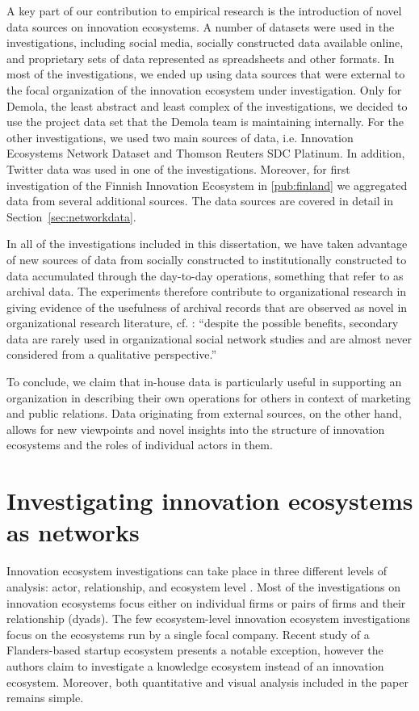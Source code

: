 A key part of our contribution to empirical research is the introduction of novel data sources on innovation ecosystems. A number of datasets were used in the investigations, including social media, socially constructed data available online, and proprietary sets of data represented as spreadsheets and other formats. In most of the investigations, we ended up using data sources that were external to the focal organization of the innovation ecosystem under investigation. Only for Demola, the least abstract and least complex of the investigations, we decided to use the project data set that the Demola team is maintaining internally. For the other investigations, we used two main sources of data, i.e. Innovation Ecosystems Network Dataset and Thomson Reuters SDC Platinum. In addition, Twitter data was used in one of the investigations. Moreover, for first investigation of the Finnish Innovation Ecosystem in \ref{pub:finland} we aggregated data from several additional sources. The data sources are covered in detail in Section~\ref{sec:networkdata}.

In all of the investigations included in this dissertation, we have taken advantage of new sources of data from socially constructed to institutionally constructed to data accumulated through the day-to-day operations, something that \cite{Williams2015MixedAnalysis} refer to as archival data. The experiments therefore contribute to organizational research in giving evidence of the usefulness of archival records that are observed as novel in organizational research literature, cf. \cite{Williams2015MixedAnalysis}: ``despite the possible benefits, secondary data are rarely used in organizational social network studies and are almost never considered from a qualitative perspective.'' 

To conclude, we claim that in-house data is particularly useful in supporting an organization in describing their own operations for others in context of marketing and public relations. Data originating from external sources, on the other hand, allows for new viewpoints and novel insights into the structure of innovation ecosystems and the roles of individual actors in them.

\section{Investigating innovation ecosystems as networks}

Innovation ecosystem investigations can take place in three different levels of analysis: actor, relationship, and ecosystem level \citep{Jarvi2016TakingReview}. Most of the investigations on innovation ecosystems focus either on individual firms or pairs of firms and their relationship (dyads). The few ecosystem-level innovation ecosystem investigations focus on the ecosystems run by a single focal company. Recent study of a Flanders-based startup ecosystem \citep{Clarysse2014CreatingEcosystems} presents a notable exception, however the authors claim to investigate a knowledge ecosystem instead of an innovation ecosystem. Moreover, both quantitative and visual analysis included in the paper remains simple.

